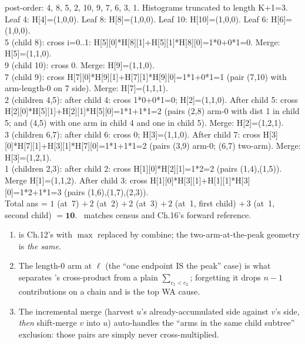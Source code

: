 \begin{tracebox}[Fold order through \coderef{c10-peak} on $T$, root~$1$, $K=2$, ans starts at $0$]
post-order: 4, 8, 5, 2, 10, 9, 7, 6, 3, 1.  Histograms truncated to
length K+1=3.\\
Leaf 4: H[4]=(1,0,0).  Leaf 8: H[8]=(1,0,0).  Leaf 10: H[10]=(1,0,0).
Leaf 6: H[6]=(1,0,0).\\
5 (child 8): cross i=0..1: H[5][0]*H[8][1]+H[5][1]*H[8][0]=1*0+0*1=0.
Merge: H[5]=(1,1,0).\\
9 (child 10): cross 0. Merge: H[9]=(1,1,0).\\
7 (child 9): cross H[7][0]*H[9][1]+H[7][1]*H[9][0]=1*1+0*1=1 (pair (7,10)
with arm-length-0 on 7 side). Merge: H[7]=(1,1,1).\\
2 (children 4,5): after child 4: cross 1*0+0*1=0; H[2]=(1,1,0). After
child 5: cross H[2][0]*H[5][1]+H[2][1]*H[5][0]=1*1+1*1=2 (pairs (2,8)
arm-0 with dist 1 in child 5; and (4,5) with one arm in child 4 and one
in child 5). Merge: H[2]=(1,2,1).\\
3 (children 6,7): after child 6: cross 0; H[3]=(1,1,0). After child 7:
cross H[3][0]*H[7][1]+H[3][1]*H[7][0]=1*1+1*1=2 (pairs (3,9) arm-0; (6,7)
two-arm). Merge: H[3]=(1,2,1).\\
1 (children 2,3): after child 2: cross H[1][0]*H[2][1]=1*2=2 (pairs
(1,4),(1,5)). Merge H[1]=(1,1,2). After child 3: cross
H[1][0]*H[3][1]+H[1][1]*H[3][0]=1*2+1*1=3 (pairs (1,6),(1,7),(2,3)).\\
Total ans = $1$ (at~7) $+\,2$ (at~2) $+\,2$ (at~3) $+\,2$ (at~1, first child)
$+\,3$ (at~1, second child) $= \mathbf{10}$. \checkmark\ matches
 census and Ch.16's forward reference.
\end{tracebox}

\begin{insightbox}
\begin{enumerate}[nosep, leftmargin=1.6em]
  \item {} is Ch.12's  with $\max$
        replaced by $\mathrm{combine}$; the two-arm-at-the-peak geometry
        is \emph{the same}.
  \item The length-$0$ arm at $\ell$ (the ``one endpoint IS the peak''
        case) is what separates 's cross-product from a
        plain $\sum_{c_1<c_2}$; forgetting it drops $n-1$ contributions on
        a chain and is the top WA cause.
  \item The incremental merge (harvest $u$'s already-accumulated side
        against $v$'s side, \emph{then} shift-merge $v$ into $u$)
        auto-handles the ``arms in the same child subtree'' exclusion:
        those pairs are simply never cross-multiplied.
\end{enumerate}
\end{insightbox}

